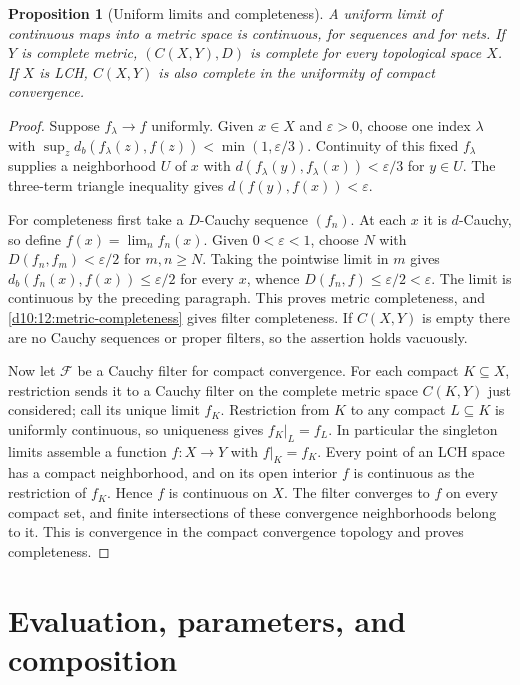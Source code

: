 \documentclass[11pt,oneside,openany]{book}
\newtheorem{proposition}[theorem]{Proposition}
\theoremstyle{definition}
\theoremstyle{remark}
\newcommand{\eps}{\varepsilon}
\begin{document}
\begin{proposition}[Uniform limits and completeness]\label{d10:13:uniform-complete}
A uniform limit of continuous maps into a metric space is continuous, for sequences and for nets. If $Y$ is complete metric, $(C(X,Y),D)$ is complete for every topological space $X$. If $X$ is LCH, $C(X,Y)$ is also complete in the uniformity of compact convergence.
\end{proposition}
\begin{proof}
Suppose $f_\lambda\to f$ uniformly. Given $x\in X$ and $\eps>0$, choose one index $\lambda$ with $\sup_zd_b(f_\lambda(z),f(z))<\min(1,\eps/3)$. Continuity of this fixed $f_\lambda$ supplies a neighborhood $U$ of $x$ with $d(f_\lambda(y),f_\lambda(x))<\eps/3$ for $y\in U$. The three-term triangle inequality gives $d(f(y),f(x))<\eps$.

For completeness first take a $D$-Cauchy sequence $(f_n)$. At each $x$ it is $d$-Cauchy, so define $f(x)=\lim_n f_n(x)$. Given $0<\eps<1$, choose $N$ with $D(f_n,f_m)<\eps/2$ for $m,n\geq N$. Taking the pointwise limit in $m$ gives $d_b(f_n(x),f(x))\leq\eps/2$ for every $x$, whence $D(f_n,f)\leq\eps/2<\eps$. The limit is continuous by the preceding paragraph. This proves metric completeness, and \cref{d10:12:metric-completeness} gives filter completeness. If $C(X,Y)$ is empty there are no Cauchy sequences or proper filters, so the assertion holds vacuously.

Now let $\mathcal F$ be a Cauchy filter for compact convergence. For each compact $K\subseteq X$, restriction sends it to a Cauchy filter on the complete metric space $C(K,Y)$ just considered; call its unique limit $f_K$. Restriction from $K$ to any compact $L\subseteq K$ is uniformly continuous, so uniqueness gives $f_K|_L=f_L$. In particular the singleton limits assemble a function $f:X\to Y$ with $f|_K=f_K$. Every point of an LCH space has a compact neighborhood, and on its open interior $f$ is continuous as the restriction of $f_K$. Hence $f$ is continuous on $X$. The filter converges to $f$ on every compact set, and finite intersections of these convergence neighborhoods belong to it. This is convergence in the compact convergence topology and proves completeness.
\end{proof}

\section{Evaluation, parameters, and composition}
\end{document}
